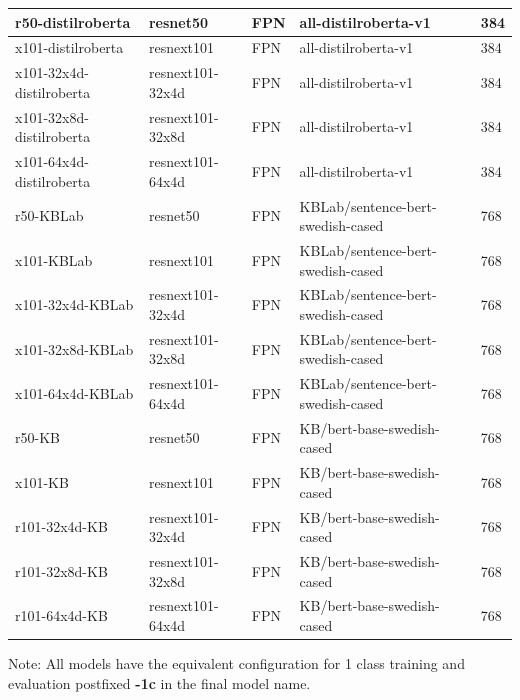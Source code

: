 \documentclass[oneside, english, bibtex]{kththesis}
\begin{document}
\begin{table}[H]
\begin{center}
\begin{adjustbox}{width=1.2\textwidth,center=\textwidth}
{\begin{tabular}{l|l|l|l|p{1.5cm}}
    r50-distilroberta & resnet50 & FPN & all-distilroberta-v1 & 384 \\     \hline
    x101-distilroberta & resnext101 & FPN & all-distilroberta-v1 & 384 \\     \hline
    x101-32x4d-distilroberta & resnext101-32x4d& FPN & all-distilroberta-v1 & 384 \\     \hline
    x101-32x8d-distilroberta & resnext101-32x8d& FPN & all-distilroberta-v1 & 384 \\     \hline
    x101-64x4d-distilroberta & resnext101-64x4d & FPN & all-distilroberta-v1 & 384 \\     \hline

    r50-KBLab & resnet50 & FPN & KBLab/sentence-bert-swedish-cased & 768 \\     \hline
    x101-KBLab & resnext101 & FPN & KBLab/sentence-bert-swedish-cased & 768 \\     \hline
    x101-32x4d-KBLab & resnext101-32x4d & FPN & KBLab/sentence-bert-swedish-cased & 768 \\     \hline
    x101-32x8d-KBLab & resnext101-32x8d & FPN & KBLab/sentence-bert-swedish-cased & 768 \\     \hline
    x101-64x4d-KBLab & resnext101-64x4d & FPN & KBLab/sentence-bert-swedish-cased & 768 \\     \hline

    r50-KB & resnet50 & FPN & KB/bert-base-swedish-cased & 768 \\     \hline
    x101-KB & resnext101 & FPN & KB/bert-base-swedish-cased & 768 \\     \hline
    r101-32x4d-KB & resnext101-32x4d & FPN & KB/bert-base-swedish-cased & 768 \\     \hline
    r101-32x8d-KB & resnext101-32x8d & FPN & KB/bert-base-swedish-cased & 768 \\     \hline
    r101-64x4d-KB & resnext101-64x4d & FPN & KB/bert-base-swedish-cased & 768 \\     \hline
    \end{tabular}
    }
    \end{adjustbox} 
  \end{center}
\begin{center}
Note: All models have the equivalent configuration for 1 class training and evaluation postfixed \textbf{-1c} in the final model name.
\end{center}
\end{table}


\clearpage
\end{document}
